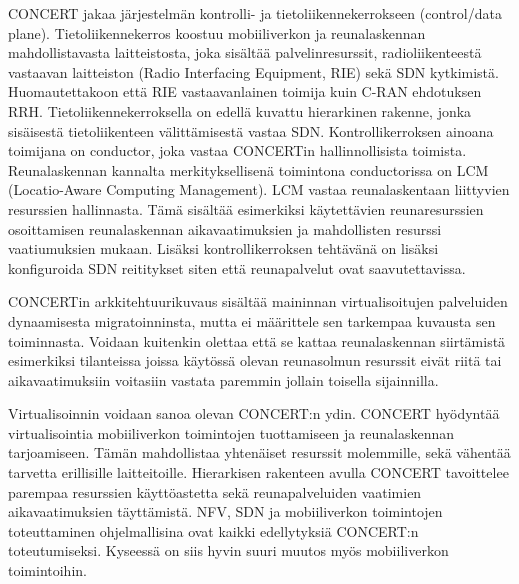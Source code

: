 CONCERT jakaa järjestelmän kontrolli- ja tietoliikennekerrokseen (control/data plane). 
Tietoliikennekerros koostuu mobiiliverkon ja reunalaskennan mahdollistavasta laitteistosta, joka sisältää palvelinresurssit, radioliikenteestä vastaavan laitteiston (Radio Interfacing Equipment, RIE) sekä SDN kytkimistä. Huomautettakoon että RIE vastaavanlainen toimija kuin C-RAN ehdotuksen RRH.
Tietoliikennekerroksella on edellä kuvattu hierarkinen rakenne, jonka sisäisestä tietoliikenteen välittämisestä vastaa SDN.
Kontrollikerroksen ainoana toimijana on conductor, joka vastaa CONCERTin hallinnollisista toimista.
Reunalaskennan kannalta merkityksellisenä toimintona conductorissa on LCM (Locatio-Aware Computing Management).
LCM vastaa reunalaskentaan liittyvien resurssien hallinnasta. Tämä sisältää esimerkiksi käytettävien reunaresurssien osoittamisen reunalaskennan aikavaatimuksien ja mahdollisten resurssi vaatiumuksien mukaan.
Lisäksi kontrollikerroksen tehtävänä on lisäksi konfiguroida SDN reititykset siten että reunapalvelut ovat saavutettavissa.

CONCERTin arkkitehtuurikuvaus sisältää maininnan virtualisoitujen palveluiden dynaamisesta migratoinninsta, mutta ei määrittele sen tarkempaa kuvausta sen toiminnasta. Voidaan kuitenkin olettaa että se kattaa reunalaskennan siirtämistä esimerkiksi tilanteissa joissa käytössä olevan reunasolmun resurssit eivät riitä tai aikavaatimuksiin voitasiin vastata paremmin jollain toisella sijainnilla.

Virtualisoinnin voidaan sanoa olevan CONCERT:n ydin. CONCERT hyödyntää virtualisointia mobiiliverkon toimintojen tuottamiseen ja reunalaskennan tarjoamiseen. Tämän mahdollistaa yhtenäiset resurssit molemmille, sekä vähentää tarvetta erillisille laitteitoille.
Hierarkisen rakenteen avulla CONCERT tavoittelee parempaa resurssien käyttöastetta sekä  reunapalveluiden vaatimien aikavaatimuksien täyttämistä.
NFV, SDN ja mobiiliverkon toimintojen toteuttaminen ohjelmallisina ovat kaikki edellytyksiä CONCERT:n toteutumiseksi. Kyseessä on siis hyvin suuri muutos myös mobiiliverkon toimintoihin.
